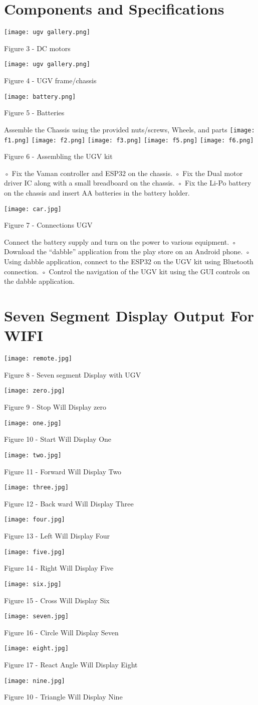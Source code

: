 \documentclass[journal,12pt,twocolumn]{IEEEtran}
\begin{document}
\section{Components and Specifications}
\texttt{[image: ugv gallery.png]}
\centerline{Figure 3 - DC motors}

\texttt{[image: ugv gallery.png]}
\centerline{Figure 4 - UGV frame/chassis}

\texttt{[image: battery.png]}
\centerline{Figure 5 - Batteries}
Assemble the Chassis using the provided nuts/screws, Wheels, and parts
\texttt{[image: f1.png]}
\texttt{[image: f2.png]}
\texttt{[image: f3.png]}
\texttt{[image: f5.png]}
\texttt{[image: f6.png]}
\centerline{Figure 6 - Assembling the UGV kit}
◦ Fix the Vaman controller and ESP32 on the chassis.
◦ Fix the Dual motor driver IC along with a small breadboard on the chassis.
◦ Fix the Li-Po battery on the chassis and insert AA batteries in the battery holder.

\texttt{[image: car.jpg]}
\centerline{Figure 7 -  Connections UGV }
Connect the battery supply and turn on the power to various equipment.
◦ Download the “dabble” application from the play store on an Android phone.
◦ Using dabble application, connect to the ESP32 on the UGV kit using Bluetooth connection.
◦ Control the navigation of the UGV kit using the GUI controls on the dabble application.


\section{Seven Segment Display Output For WIFI}
\texttt{[image: remote.jpg]}
\centerline{Figure 8 -   Seven segment Display with UGV }
\texttt{[image: zero.jpg]}
\centerline{Figure 9 -   Stop Will Display zero }
\texttt{[image: one.jpg]}
\centerline{Figure 10 -  Start Will Display One }
\texttt{[image: two.jpg]}
\centerline{Figure 11 -  Forward Will Display Two }
\texttt{[image: three.jpg]}
\centerline{Figure 12 -  Back ward Will Display Three }
\texttt{[image: four.jpg]}
\centerline{Figure 13 -  Left Will Display Four }
\texttt{[image: five.jpg]}
\centerline{Figure 14 -  Right Will Display Five }
\texttt{[image: six.jpg]}
\centerline{Figure 15 -  Cross Will Display Six }
\texttt{[image: seven.jpg]}
\centerline{Figure 16 -  Circle Will Display Seven }
\texttt{[image: eight.jpg]}
\centerline{Figure 17 -  React Angle Will Display Eight }
\texttt{[image: nine.jpg]}
\centerline{Figure 10 -  Triangle Will Display Nine }
\end{document}
